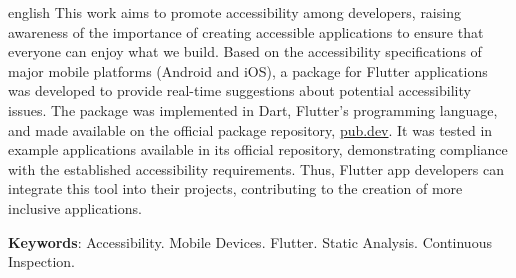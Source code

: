 
\begin{resumo}[Abstract]
 \begin{otherlanguage*}{english}
  This work aims to promote accessibility among developers, raising awareness of the importance of creating accessible applications to ensure that everyone can enjoy what we build. Based on the accessibility specifications of major mobile platforms (Android and iOS), a package for Flutter applications was developed to provide real-time suggestions about potential accessibility issues. The package was implemented in Dart, Flutter’s programming language, and made available on the official package repository, \href{https://pub.dev}{pub.dev}. It was tested in example applications available in its official repository, demonstrating compliance with the established accessibility requirements. Thus, Flutter app developers can integrate this tool into their projects, contributing to the creation of more inclusive applications.

  \textbf{Keywords}: Accessibility. Mobile Devices. Flutter. Static Analysis. Continuous Inspection.
  \end{otherlanguage*}
\end{resumo}

